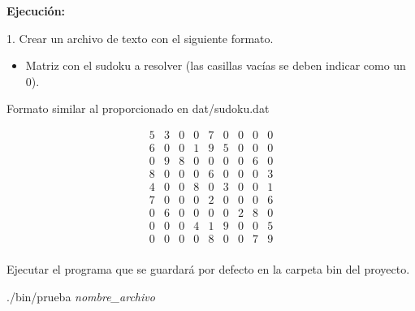 \documentclass[11pt, a4paper]{article}
\theoremstyle{theorem-style}
\theoremstyle{definition-style}
\theoremstyle{remark-style}
\theoremstyle{example-style}
\begin{document}
\textbf{Ejecución:} 

1. Crear un archivo de texto con el siguiente formato.
\begin{itemize}
\item Matriz con el sudoku a resolver (las casillas vacías se deben indicar como un 0).
\end{itemize}

Formato similar al proporcionado en dat/sudoku.dat

\[
\begin{array}{ccccccccc}
5 & 3 & 0 & 0 & 7 & 0 & 0 & 0 & 0\\
6 & 0 & 0 & 1 & 9 & 5 & 0 & 0 & 0\\
0 & 9 & 8 & 0 & 0 & 0 & 0 & 6 & 0\\
8 & 0 & 0 & 0 & 6 & 0 & 0 & 0 & 3\\
4 & 0 & 0 & 8 & 0 & 3 & 0 & 0 & 1\\
7 & 0 & 0 & 0 & 2 & 0 & 0 & 0 & 6\\
0 & 6 & 0 & 0 & 0 & 0 & 2 & 8 & 0\\
0 & 0 & 0 & 4 & 1 & 9 & 0 & 0 & 5\\
0 & 0 & 0 & 0 & 8 & 0 & 0 & 7 & 9\\
\end{array}
\]

Ejecutar el programa que se guardará por defecto en la carpeta bin del proyecto. 

./bin/prueba \textit{nombre\_archivo}
	
\end{document}
